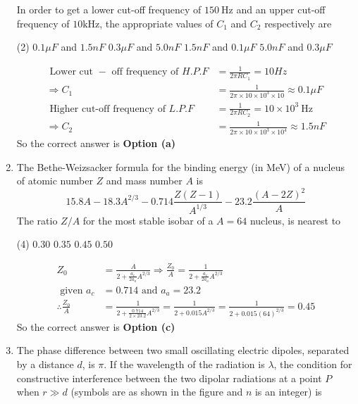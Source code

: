 \begin{enumerate}
In order to get a lower cut-off frequency of $150 \mathrm{~Hz}$ and an upper cut-off frequency of $10 \mathrm{kHz}$, the appropriate values of $C_{1}$ and $C_{2}$ respectively are
 \begin{tasks}(2)
	\task[\textbf{a.}]$0.1 \mu F$ and $1.5 n F$
	\task[\textbf{b.}]$0.3 \mu F$ and $5.0 n F$
	\task[\textbf{c.}] $1.5 n F$ and $0.1 \mu F$
	\task[\textbf{d.}]  $5.0 n F$ and $0.3 \mu F$
\end{tasks}
\begin{answer}
	\begin{align*}
	\text { Lower cut }-\text { off frequency of } H . P . F&=\frac{1}{2 \pi R C_{1}}=10 H z\\
	\Rightarrow C_{1}&=\frac{1}{2 \pi \times 10 \times 10^{3} \times 10} \approx 0.1 \mu F\\
	\text { Higher cut-off frequency of } L . P . F&=\frac{1}{2 \pi R C_{2}}=10 \times 10^{3} \mathrm{~Hz}\\
	\Rightarrow C_{2}&=\frac{1}{2 \pi \times 10 \times 10^{3} \times 10^{4}} \approx 1.5 n F
	\end{align*}
	So the correct answer is \textbf{Option (a)}
\end{answer}
\item The Bethe-Weizsacker formula for the binding energy (in MeV) of a nucleus of atomic number $Z$ and mass number $A$ is
$$
15.8 A-18.3 A^{2 / 3}-0.714 \frac{Z(Z-1)}{A^{1 / 3}}-23.2 \frac{(A-2 Z)^{2}}{A}
$$
The ratio $Z / A$ for the most stable isobar of a $A=64$ nucleus, is nearest to
 \begin{tasks}(4)
	\task[\textbf{a.}]$0.30$
	\task[\textbf{b.}]$0.35$
	\task[\textbf{c.}]$0.45$
	\task[\textbf{d.}] $0.50$
\end{tasks}
\begin{answer}
	\begin{align*}
	Z_{0}&=\frac{A}{2+\frac{a_{c}}{2 a_{a}} A^{2 / 3}} \Rightarrow \frac{Z_{0}}{A}=\frac{1}{2+\frac{a_{c}}{2 a_{a}} A^{2 / 3}}\\
	\text { given } a_{c}&=0.714 \text { and } a_{a}=23.2\\
	\therefore \frac{Z_{0}}{A}&=\frac{1}{2+\frac{0.714}{2 \times 23.2} A^{2 / 3}}=\frac{1}{2+0.015 A^{2 / 3}}=\frac{1}{2+0.015(64)^{2 / 3}}=0.45
	\end{align*}
	So the correct answer is \textbf{Option (c)}
\end{answer}
\item The phase difference between two small oscillating electric dipoles, separated by a distance $d$, is $\pi$. If the wavelength of the radiation is $\lambda$, the condition for constructive interference between the two dipolar radiations at a point $P$ when $r \gg d$ (symbols are as shown in the figure and $n$ is an integer) is

\end{enumerate}
